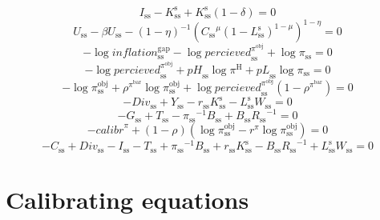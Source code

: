\begin{equation}
I_\mathrm{ss} - K^{\mathrm{s}}_\mathrm{ss} + {K^{\mathrm{s}}_\mathrm{ss}} \left(1 - \delta\right) = 0
\end{equation}
\begin{equation}
U_\mathrm{ss} - {\beta} {U_\mathrm{ss}} - \left(1 - \eta\right)^{-1} {\left({{C_\mathrm{ss}}^{\mu}} {\left(1 - L^{\mathrm{s}}_\mathrm{ss}\right)^{1 - \mu}}\right)^{1 - \eta}} = 0
\end{equation}
\begin{equation}
-\log{{i\!n\!f\!l\!a\!t\!i\!o\!n}^{\mathrm{gap}}_\mathrm{ss}} - \log{{p\!e\!r\!c\!i\!e\!v\!e\!d}^{\pi^{\mathrm{obj}}}_\mathrm{ss}} + \log{\pi_\mathrm{ss}} = 0
\end{equation}
\begin{equation}
-\log{{p\!e\!r\!c\!i\!e\!v\!e\!d}^{\pi^{\mathrm{obj}}}_\mathrm{ss}} + {{p\!H}_\mathrm{ss}} {\log{\pi^{\mathrm{H}}}} + {{p\!L}_\mathrm{ss}} {\log{\pi_\mathrm{ss}}} = 0
\end{equation}
\begin{equation}
-\log{\pi^{\mathrm{obj}}_\mathrm{ss}} + {\rho^{\pi^{\mathrm{bar}}}} {\log{\pi^{\mathrm{obj}}_\mathrm{ss}}} + {\log{{p\!e\!r\!c\!i\!e\!v\!e\!d}^{\pi^{\mathrm{obj}}}_\mathrm{ss}}} \left(1 - \rho^{\pi^{\mathrm{bar}}}\right) = 0
\end{equation}
\begin{equation}
-{D\!i\!v}_\mathrm{ss} + Y_\mathrm{ss} - {r_\mathrm{ss}} {K^{\mathrm{s}}_\mathrm{ss}} - {L^{\mathrm{s}}_\mathrm{ss}} {W_\mathrm{ss}} = 0
\end{equation}
\begin{equation}
-G_\mathrm{ss} + T_\mathrm{ss} - {\pi_\mathrm{ss}}^{-1} {B_\mathrm{ss}} + {B_\mathrm{ss}} {R_\mathrm{ss}}^{-1} = 0
\end{equation}
\begin{equation}
-{c\!a\!l\!i\!b\!r}^{\pi} + \left(1 - \rho\right) \left(\log{\pi^{\mathrm{obj}}_\mathrm{ss}} - {r^{\pi}} {\log{\pi^{\mathrm{obj}}_\mathrm{ss}}}\right) = 0
\end{equation}
\begin{equation}
-C_\mathrm{ss} + {D\!i\!v}_\mathrm{ss} - I_\mathrm{ss} - T_\mathrm{ss} + {\pi_\mathrm{ss}}^{-1} {B_\mathrm{ss}} + {r_\mathrm{ss}} {K^{\mathrm{s}}_\mathrm{ss}} - {B_\mathrm{ss}} {R_\mathrm{ss}}^{-1} + {L^{\mathrm{s}}_\mathrm{ss}} {W_\mathrm{ss}} = 0
\end{equation}



\section{Calibrating equations}

